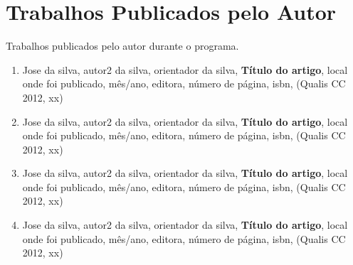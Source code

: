%
\chapter*{Trabalhos Publicados pelo Autor}

\noindent
Trabalhos publicados pelo autor durante o programa.

\vspace{12pt}

\begin{enumerate}

\item Jose da silva, autor2 da silva, orientador da silva, \textbf{Título do artigo}, local onde foi
publicado, mês/ano, editora, número de página, isbn, (Qualis CC 2012, xx)

\item Jose da silva, autor2 da silva, orientador da silva, \textbf{Título do artigo}, local onde foi
publicado, mês/ano, editora, número de página, isbn, (Qualis CC 2012, xx)

\item Jose da silva, autor2 da silva, orientador da silva, \textbf{Título do artigo}, local onde foi
publicado, mês/ano, editora, número de página, isbn, (Qualis CC 2012, xx)

\item Jose da silva, autor2 da silva, orientador da silva, \textbf{Título do artigo}, local onde foi
publicado, mês/ano, editora, número de página, isbn, (Qualis CC 2012, xx)

\end{enumerate}
